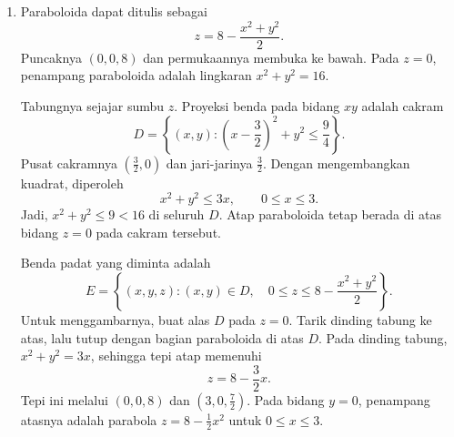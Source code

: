 \documentclass[11pt,a4paper]{article}
\newcommand{\R}{\mathbb{R}}
\begin{document}
\begin{enumerate}[itemsep=12pt,parsep=5pt]
\begin{enumerate}
                Di titik asal, rumus tersebut tidak mendefinisikan $f(0,0)$.
                Agar menjadi fungsi yang kontinu pada seluruh $\R^2$, definisikan
                \[
                  \widetilde f(x,y)=
                  \begin{cases}
                    \dfrac{2x^2y^2}{x^2+y^2}, & (x,y)\ne(0,0), \\[4pt]
                    0,                        & (x,y)=(0,0).
                  \end{cases}
                \]
                Hasil (a) memberikan
                \[
                  \lim_{(x,y)\to(0,0)}\widetilde f(x,y)
                  =0=\widetilde f(0,0).
                \]
                Jadi, perluasan dengan nilai $0$ di titik asal bersifat kontinu.
        \end{enumerate}

  \item Paraboloida dapat ditulis sebagai
        \[
          z=8-\frac{x^2+y^2}{2}.
        \]
        Puncaknya $(0,0,8)$ dan permukaannya membuka ke bawah.
        Pada $z=0$, penampang paraboloida adalah lingkaran $x^2+y^2=16$.

        Tabungnya sejajar sumbu $z$.
        Proyeksi benda pada bidang $xy$ adalah cakram
        \[
          D=\left\{(x,y):\left(x-\frac32\right)^2+y^2\le\frac94\right\}.
        \]
        Pusat cakramnya $\left(\frac32,0\right)$ dan jari-jarinya $\frac32$.
        Dengan mengembangkan kuadrat, diperoleh
        \[
          x^2+y^2\le3x,\qquad 0\le x\le3.
        \]
        Jadi, $x^2+y^2\le9<16$ di seluruh $D$.
        Atap paraboloida tetap berada di atas bidang $z=0$ pada cakram tersebut.

        Benda padat yang diminta adalah
        \[
          E=\left\{(x,y,z):(x,y)\in D,\quad
          0\le z\le8-\frac{x^2+y^2}{2}\right\}.
        \]
        Untuk menggambarnya, buat alas $D$ pada $z=0$.
        Tarik dinding tabung ke atas, lalu tutup dengan bagian paraboloida di atas $D$.
        Pada dinding tabung, $x^2+y^2=3x$, sehingga tepi atap memenuhi
        \[
          z=8-\frac32x.
        \]
        Tepi ini melalui $(0,0,8)$ dan $\left(3,0,\frac72\right)$.
        Pada bidang $y=0$, penampang atasnya adalah parabola
        $z=8-\frac12x^2$ untuk $0\le x\le3$.


\end{enumerate}
\end{document}

